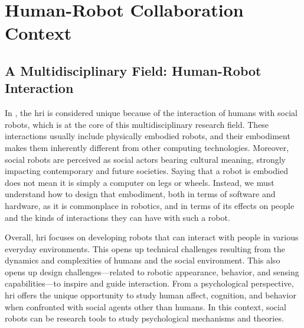 \cleardoublepage

\ifdefined{}
\else
\setcounter{chapter}{0}
\dominitoc
\faketableofcontents
\fi

\chapter{Human-Robot Collaboration Context}
\label{chap:1}
\minitoc




\section{A Multidisciplinary Field: Human-Robot Interaction}

In \cite{bartneck_human_robot_2020}, the \acrfull{hri} is considered unique because of the interaction of humans with social robots, which is at the core of this multidisciplinary research field. These interactions usually include physically embodied robots, and their embodiment makes them inherently different from other computing technologies. Moreover, social robots are perceived as social actors bearing cultural meaning, strongly impacting contemporary and future societies. Saying that a robot is embodied does not mean it is simply a computer on legs or wheels. Instead, we must understand how to design that embodiment, both in terms of software and hardware, as it is commonplace in robotics, and in terms of its effects on people and the kinds of interactions they can have with such a robot.

Overall, \acrfull{hri} focuses on developing robots that can interact with people in various everyday environments. This opens up technical challenges resulting from the dynamics and complexities of humans and the social environment. This also opens up design challenges—related to robotic appearance, behavior, and sensing capabilities—to inspire and guide interaction. From a psychological perspective, \acrshort{hri} offers the unique opportunity to study human affect, cognition, and behavior when confronted with social agents other than humans. In this context, social robots can be research tools to study psychological mechanisms and theories.

